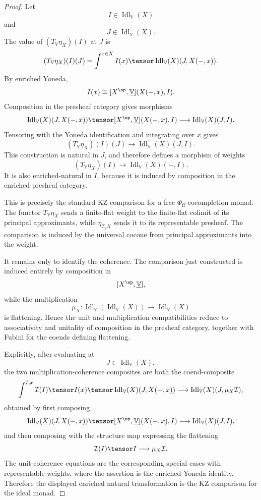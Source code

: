 \begin{proof}
Let
\[
    I\in\operatorname{Idl}_{\mathbb V}(X)
\]
and
\[
    J\in\operatorname{Idl}_{\mathbb V}(X).
\]
The value of \((T_{\mathbb V}\eta_X)(I)\) at \(J\) is
\[
    (T_{\mathbb V}\eta_X)(I)(J)
    =
    \int^{x\in X}
        I(x)\tensor
        \operatorname{Idl}_{\mathbb V}(X)(J,X(-,x)).
\]
By enriched Yoneda,
\[
    I(x)
    \cong
    [X^{\op},\underline{\mathbb V}](X(-,x),I).
\]
Composition in the presheaf category gives morphisms
\[
    \operatorname{Idl}_{\mathbb V}(X)(J,X(-,x))
    \tensor
    [X^{\op},\underline{\mathbb V}](X(-,x),I)
    \longrightarrow
    \operatorname{Idl}_{\mathbb V}(X)(J,I).
\]
Tensoring with the Yoneda identification and integrating over \(x\) gives
\[
    (T_{\mathbb V}\eta_X)(I)(J)
    \longrightarrow
    \operatorname{Idl}_{\mathbb V}(X)(J,I).
\]
This construction is natural in \(J\), and therefore defines a morphism of
weights
\[
    (T_{\mathbb V}\eta_X)(I)
    \longrightarrow
    \operatorname{Idl}_{\mathbb V}(X)(-,I).
\]
It is also enriched-natural in \(I\), because it is induced by composition in the
enriched presheaf category.

This is precisely the standard KZ comparison for a free
\(\Phi_{\mathrm{ff}}\)-cocompletion monad.  The functor \(T_{\mathbb V}\eta_X\)
sends a finite-flat weight to the finite-flat colimit of its principal
approximants, while \(\eta_{T_{\mathbb V}X}\) sends it to its representable
presheaf.  The comparison is induced by the universal cocone from principal
approximants into the weight.

It remains only to identify the coherence.  The comparison just constructed is
induced entirely by composition in
\[
    [X^{\op},\underline{\mathbb V}],
\]
while the multiplication
\[
    \mu_X:
    \operatorname{Idl}_{\mathbb V}(\operatorname{Idl}_{\mathbb V}(X))
    \to
    \operatorname{Idl}_{\mathbb V}(X)
\]
is flattening.  Hence the unit and multiplication compatibilities reduce to
associativity and unitality of composition in the presheaf category, together
with Fubini for the coends defining flattening.

Explicitly, after evaluating at
\[
    J\in\operatorname{Idl}_{\mathbb V}(X),
\]
the two multiplication-coherence composites are both the coend-composite
\[
    \int^{I,x}
        \mathcal I(I)\tensor I(x)\tensor
        \operatorname{Idl}_{\mathbb V}(X)(J,X(-,x))
    \longrightarrow
    \operatorname{Idl}_{\mathbb V}(X)(J,\mu_X\mathcal I),
\]
obtained by first composing
\[
    \operatorname{Idl}_{\mathbb V}(X)(J,X(-,x))
    \tensor
    [X^{\op},\underline{\mathbb V}](X(-,x),I)
    \longrightarrow
    \operatorname{Idl}_{\mathbb V}(X)(J,I),
\]
and then composing with the structure map expressing the flattening
\[
    \mathcal I(I)\tensor I
    \longrightarrow
    \mu_X\mathcal I.
\]
The unit-coherence equations are the corresponding special cases with
representable weights, where the assertion is the enriched Yoneda identity.
Therefore the displayed enriched natural transformation is the KZ comparison for
the ideal monad.
\end{proof}

